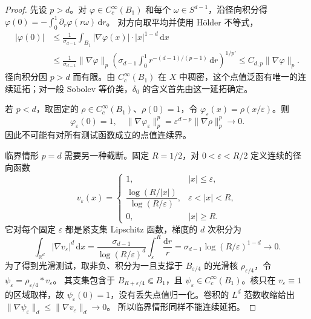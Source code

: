 \begin{proof}
先设 \(p>d\)。对 \(\varphi\in C_c^\infty(B_1)\) 和每个 \(\omega\in S^{d-1}\)，沿径向积分得
\(\varphi(0)=-\int_0^1\partial_r\varphi(r\omega)\,\mathrm dr\)。
对方向取平均并使用 Hölder 不等式，
\begin{align*}
 |\varphi(0)|
 &\le\frac1{\sigma_{d-1}}\int_{B_1}
       |\nabla\varphi(x)|\cdot|x|^{1-d}\,\mathrm dx\\
 &\le\frac1{\sigma_{d-1}}\|\nabla\varphi\|_p
      \left(\sigma_{d-1}\int_0^1r^{-(d-1)/(p-1)}\,\mathrm dr\right)^{1/p'}
 \le C_{d,p}\|\nabla\varphi\|_p.
\end{align*}
径向积分因 \(p>d\) 而有限。由 \(C_c^\infty(B_1)\) 在 \(X\) 中稠密，这个点值泛函有唯一的连续延拓；对一般 Sobolev 等价类，\(\delta_0\) 的含义首先由这一延拓确定。

若 \(p<d\)，取固定的 \(\rho\in C_c^\infty(B_1)\)、\(\rho(0)=1\)，令 \(\varphi_\varepsilon(x)=\rho(x/\varepsilon)\)。则
\[
 \varphi_\varepsilon(0)=1,
 \quad\|\nabla\varphi_\varepsilon\|_p^p
   =\varepsilon^{d-p}\|\nabla\rho\|_p^p\longrightarrow0.
\]
因此不可能有对所有测试函数成立的点值连续界。

临界情形 \(p=d\) 需要另一种截断。固定 \(R=1/2\)，对 \(0<\varepsilon<R/2\) 定义连续的径向函数
\[
 v_\varepsilon(x)=
 \begin{cases}
 1,&|x|\le\varepsilon,\\
 \dfrac{\log(R/|x|)}{\log(R/\varepsilon)},&\varepsilon<|x|<R,\\[3pt]
 0,&|x|\ge R.
 \end{cases}
\]
它对每个固定 \(\varepsilon\) 都是紧支集 Lipschitz 函数，梯度的 \(d\) 次积分为
\[
 \int_{\mathbb R^d}|\nabla v_\varepsilon|^d\,\mathrm dx
 =\frac{\sigma_{d-1}}{\log(R/\varepsilon)^d}
       \int_\varepsilon^R\frac{\mathrm dr}{r}
 =\sigma_{d-1}\log(R/\varepsilon)^{1-d}\longrightarrow0.
\]
为了得到光滑测试，取非负、积分为一且支撑于 \(B_{\varepsilon/4}\) 的光滑核 \(\rho_{\varepsilon/4}\)，令
\(\psi_\varepsilon=\rho_{\varepsilon/4}*v_\varepsilon\)。
其支集包含于 \(B_{R+\varepsilon/4}\Subset B_1\)，且 \(\psi_\varepsilon\in C_c^\infty(B_1)\)。核只在 \(v_\varepsilon\equiv1\) 的区域取样，故 \(\psi_\varepsilon(0)=1\)，没有丢失点值归一化。卷积的 \(L^d\) 范数收缩给出
\(\|\nabla\psi_\varepsilon\|_d\le\|\nabla v_\varepsilon\|_d\to0\)。
所以临界情形同样不能连续延拓。
\end{proof}


